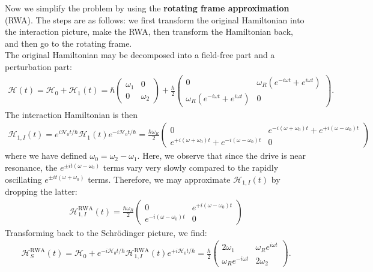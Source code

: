 \documentclass{book}
\theoremstyle{definition}
\newcommand{\ham}{\mathcal{H}}
\newcommand{\f}[2]{\frac{#1}{#2}}
\begin{document}
	Now we simplify the problem by using the  \textbf{rotating frame approximation} (RWA).  The steps are as follows: we first transform the original Hamiltonian into the interaction picture, make the RWA, then transform the Hamiltonian back, and then go to the rotating frame. \\
	
	The original Hamiltonian may be decomposed into a field-free part and a perturbation part: 
	\begin{align*}
		\ham(t) = \ham_0 + \ham_1(t) = \hbar \begin{pmatrix}
			\omega_1 & 0 \\ 0 & \omega_2
		\end{pmatrix} + \f{\hbar}{2} \begin{pmatrix}
			0 & \omega_R (e^{-i\omega t} + e^{i\omega t}) \\ \omega_R (e^{-i\omega t} + e^{i\omega t}) & 0
		\end{pmatrix}.
	\end{align*}
	The interaction Hamiltonian is then 
	\begin{align*}
		\ham_{1,I}(t) = e^{i\ham_0 t/\hbar} \ham_{1}(t) e^{-i\ham_0 t/\hbar} = 
		\f{\hbar\omega_R}{2}\begin{pmatrix}
			0 & e^{-i(\omega + \omega_0)t} + e^{+i(\omega - \omega_0)t}   
			\\ 
			e^{+i(\omega + \omega_0)t} + e^{-i(\omega - \omega_0)t} & 0
		\end{pmatrix}
	\end{align*}
	where we have defined $\omega_0 = \omega_2 - \omega_1$. Here, we observe that since the drive is near resonance, the $e^{\pm it(\omega - \omega_0)}$ terms vary very slowly compared to the rapidly oscillating $e^{\pm it(\omega+\omega_0)}$ terms. Therefore, we may approximate $\ham_{1,I}(t)$ by dropping the latter:
	\begin{align*}
		\ham_{1,I}^{\text{RWA}}(t) = \f{\hbar\omega_R}{2}\begin{pmatrix}
			0 & e^{+i(\omega - \omega_0)t}   
			\\ 
			e^{-i(\omega - \omega_0)t} & 0
		\end{pmatrix}
	\end{align*}
	Transforming back to the Schr\"{o}dinger picture, we find:
	\begin{align*}
		\ham_S^\text{RWA}(t) = \ham_0 + e^{-i\ham_0 t/\hbar} \ham_{1,I}^{\text{RWA}}(t) e^{+i\ham_0 t/\hbar} = \f{\hbar}{2}\begin{pmatrix}
			2\omega_1 & \omega_R e^{i\omega t} \\ \omega_R e^{-i\omega t} & 2\omega_2
		\end{pmatrix}.
	\end{align*}
\end{document}
